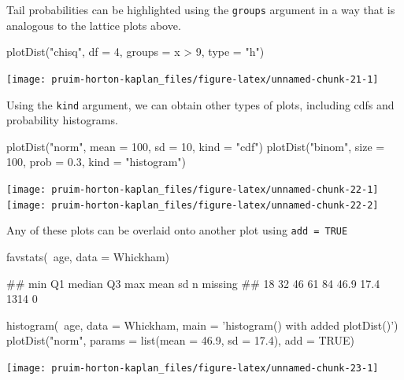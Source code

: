\noindent
Tail probabilities can be highlighted using the \texttt{groups} argument
in a way that is analogous to the lattice plots above.

\begin{Schunk}
\begin{Sinput}
plotDist("chisq", df = 4, groups = x > 9, type = "h")
\end{Sinput}


\begin{center}\texttt{[image: pruim-horton-kaplan\_files/figure-latex/unnamed-chunk-21-1]} \end{center}

\end{Schunk}

\noindent
Using the \texttt{kind} argument, we can obtain other types of plots,
including cdfs and probability histograms.

\begin{Schunk}
\begin{Sinput}
plotDist("norm", mean = 100, sd = 10, kind = "cdf")
plotDist("binom", size = 100, prob = 0.3, kind = "histogram")
\end{Sinput}


\begin{center}\texttt{[image: pruim-horton-kaplan\_files/figure-latex/unnamed-chunk-22-1]} \texttt{[image: pruim-horton-kaplan\_files/figure-latex/unnamed-chunk-22-2]} \end{center}

\end{Schunk}

\noindent
Any of these plots can be overlaid onto another plot using
\texttt{add\ =\ TRUE}

\begin{Schunk}
\begin{Sinput}
favstats(~age, data = Whickham)
\end{Sinput}
\begin{Soutput}
##  min Q1 median Q3 max mean   sd    n missing
##   18 32     46 61  84 46.9 17.4 1314       0
\end{Soutput}
\begin{Sinput}
histogram(~age, data = Whickham, main = 'histogram() with added plotDist()')
plotDist("norm", params = list(mean = 46.9, sd = 17.4), add = TRUE)
\end{Sinput}


\begin{center}\texttt{[image: pruim-horton-kaplan\_files/figure-latex/unnamed-chunk-23-1]} \end{center}

\end{Schunk}

